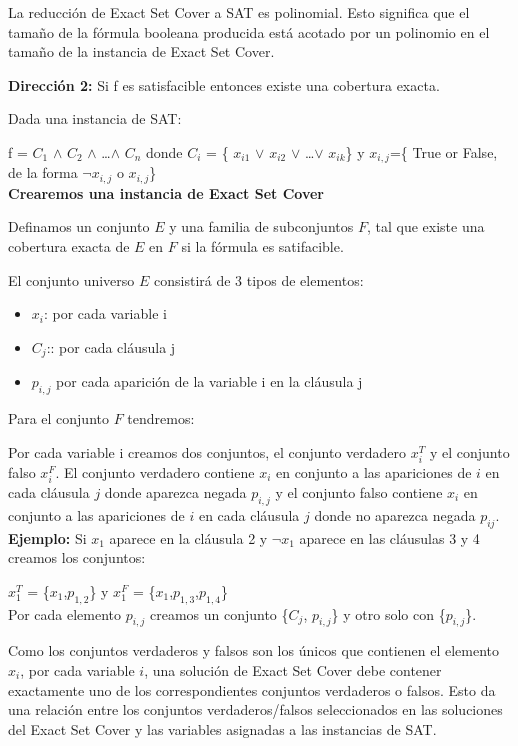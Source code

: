 \documentclass{article}
\begin{document}
La reducción de Exact Set Cover a SAT es polinomial. Esto significa que el tamaño de la fórmula booleana producida está acotado por un polinomio en el tamaño de la instancia de Exact Set Cover.

\textbf{Dirección 2:} Si f es satisfacible entonces existe una cobertura exacta.

Dada una instancia de SAT:

f = $C_1$ $\wedge$ $C_2$ $\wedge$ \dots $\wedge$ $C_n$
donde $C_i$ = \{ $x_{i1}$ $\vee$ $x_{i2}$ $\vee$ \dots $\vee$ $x_{ik}$\}
y \(x_{i,j}\)=\{ True or False, de la forma $\neg$$x_{i,j}$ o $x_{i,j}$\}\\

\textbf{Crearemos una instancia de Exact Set Cover}

Definamos un conjunto \(E\) y una familia de subconjuntos \(F\), tal que existe una cobertura exacta de \(E\) en \(F\) si la fórmula es satifacible.

El conjunto universo \(E\) consistirá de 3 tipos de elementos:

\begin{itemize}
    \item $x_i$: por cada variable i
    \item $C_j$:: por cada cláusula j
    \item $p_{i,j}$ por cada aparición de la variable i en la cláusula j
\end{itemize}

Para el conjunto \(F\) tendremos:

Por cada variable i creamos dos conjuntos, el conjunto verdadero $x_{i}^{T}$ y el conjunto falso $x_{i}^{F}$. El conjunto verdadero contiene $x_i$ en conjunto a las apariciones de \(i\) en cada cláusula \(j\) donde aparezca negada $p_{i,j}$ y el conjunto falso contiene $x_i$ en conjunto a las apariciones de \(i\) en cada cláusula \(j\) donde no aparezca negada $p_{ij}$.\\

\textbf{Ejemplo:} Si $x_1$ aparece en la cláusula 2 y $\neg$$x_1$ aparece en las cláusulas 3 y 4 creamos los conjuntos:

$x_{1}^{T}$ = \{$x_1$,$p_{1,2}$\} y $x_{1}^{F}$ = \{$x_1$,$p_{1,3}$,$p_{1,4}$\}\\

Por cada elemento $p_{i,j}$ creamos un conjunto \{$C_j$, $p_{i,j}$\} y otro solo con \{$p_{i,j}$\}.

Como los conjuntos verdaderos y falsos son los únicos que contienen el elemento $x_i$, por cada variable $i$, una solución de Exact Set Cover debe contener exactamente uno de los correspondientes conjuntos verdaderos o falsos. Esto da una relación entre los conjuntos verdaderos/falsos seleccionados en las soluciones del Exact Set Cover y las variables asignadas a las instancias de SAT.
\end{document}
